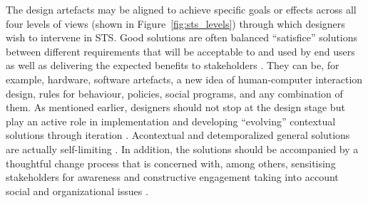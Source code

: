 The design artefacts may be aligned to achieve specific goals or effects across all four levels of views (shown in Figure~\ref{fig:sts_levels}) through which designers wish to intervene in STS. Good solutions are often balanced ``satisfice'' solutions between different requirements that will be acceptable to and used by end users as well as delivering the expected benefits to stakeholders \cite{Baxter2011,Norman2015}. 
They can be, for example, hardware, software artefacts, a new idea of human-computer interaction design, rules for behaviour, policies, social programs, and any combination of them. As mentioned earlier, designers should not stop at the design stage but play an active role in implementation and developing ``evolving'' contextual solutions through iteration \cite{Norman2015}. Acontextual and detemporalized general solutions are actually self-limiting \cite{Sawyer2014}. 
% 
In addition, the solutions should be accompanied by a thoughtful change process that is concerned with, among others, sensitising stakeholders for awareness and constructive engagement taking into account social and organizational issues \cite{Baxter2011}.


%
%
%


